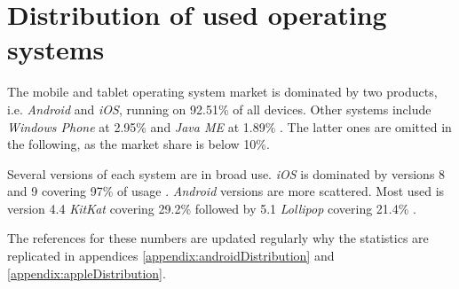 \section{Distribution of used operating systems}\label{preStudy:devices}

The mobile and tablet operating system market is dominated by two products, i.e. \textit{Android} and \textit{iOS}, running on 92.51\% of all devices. 
Other systems include \textit{Windows Phone} at 2.95\% and \textit{Java ME} at 1.89\% \citep{preStudy:devices:companies}.
The latter ones are omitted in the following, as the market share is below 10\%.

Several versions of each system are in broad use.
\textit{iOS} is dominated by versions 8 and 9 covering 97\% of usage \citep{preStudy:devices:apple}.
\textit{Android} versions are more scattered. 
Most used is version 4.4 \textit{KitKat} covering 29.2\% followed by 5.1 \textit{Lollipop} covering 21.4\% \citep{preStudy:devices:android}.

The references for these numbers are updated regularly why the statistics are replicated in appendices \ref{appendix:androidDistribution} and \ref{appendix:appleDistribution}.
